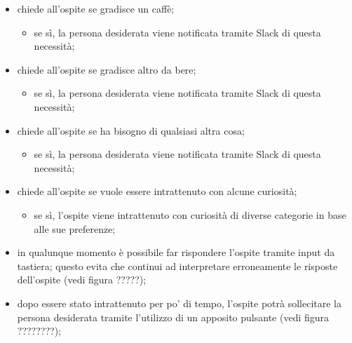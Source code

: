 \begin{itemize}
\begin{itemize}
\begin{itemize}
		\end{itemize}
	\end{itemize}
	\item \PROGETTO{} chiede all'ospite se gradisce un caffè;
	\begin{itemize}
		\item se sì, la persona desiderata viene notificata tramite Slack di questa necessità;
	\end{itemize}
	\item \PROGETTO{} chiede all'ospite se gradisce altro da bere;
	\begin{itemize}
		\item se sì, la persona desiderata viene notificata tramite Slack di questa necessità;
	\end{itemize}
	\item \PROGETTO{} chiede all'ospite se ha bisogno di qualsiasi altra cosa;
	\begin{itemize}
		\item se sì, la persona desiderata viene notificata tramite Slack di questa necessità;
	\end{itemize}
	\item \PROGETTO{} chiede all'ospite se vuole essere intrattenuto con alcune curiosità;
	\begin{itemize}
		\item se sì, l'ospite viene intrattenuto con curiosità di diverse categorie in base alle sue preferenze;
	\end{itemize}
	\item in qualunque momento è possibile far rispondere l'ospite tramite input da tastiera; questo evita che \PROGETTO{} continui ad 			interpretare erroneamente le risposte dell'ospite (vedi figura ?????);
	\item dopo essere stato intrattenuto per po' di tempo, l'ospite potrà sollecitare la persona desiderata tramite l'utilizzo di un apposito pulsante (vedi figura ????????);
	
\end{itemize}
